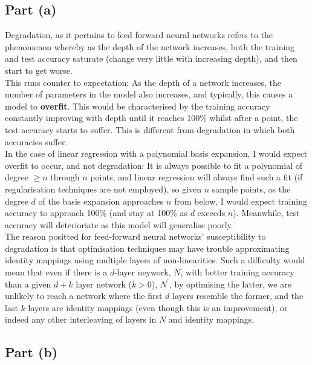 \subsection{Part (a)}

Degradation\cite{DBLP:journals/corr/HeZRS15}, as it pertains to feed forward neural networks refers to the phenomenon whereby as the depth of the network increases, both the training and test accuracy saturate (change very little with increasing depth), and then start to get worse.\\[1em]

This runs counter to expectation: As the depth of a network increases, the number of parameters in the model also increases, and typically, this causes a model to \textbf{overfit}. This would be characterised by the training accuracy constantly improving with depth until it reaches 100\% whilst after a point, the test accuracy starts to suffer. This is different from degradation in which both accuracies suffer.\\[1em]

In the case of linear regression with a polynomial basis expansion, I would expect overfit to occur, and not degradation: It is always possible to fit a polynomial of degree $\geq n$ through $n$ points, and linear regression will always find such a fit (if regularisation techniques are not employed), so given $n$ sample points, as the degree $d$ of the basis expansion approaches $n$ from below, I would expect training accuracy to approach 100\% (and stay at 100\% as $d$ exceeds $n$). Meanwhile, test accuracy will deterioriate as this model will generalise poorly.\\[1em]

The reason positted for feed-forward neural networks' susceptibility to degradation is that optimisation techniques may have trouble approximating identity mappings using multiple layers of non-linearities. Such a difficulty would mean that even if there is a $d$-layer neywork, $N$, with better training accuracy than a given $d+k$ layer network ($k > 0$), $N^\prime$, by optimising the latter, we are unlikely to reach a network where the first $d$ layers resemble the former, and the last $k$ layers are identity mappings (even though this is an improvement), or indeed any other interleaving of layers in $N$ and identity mappings.

\subsection{Part (b)}

